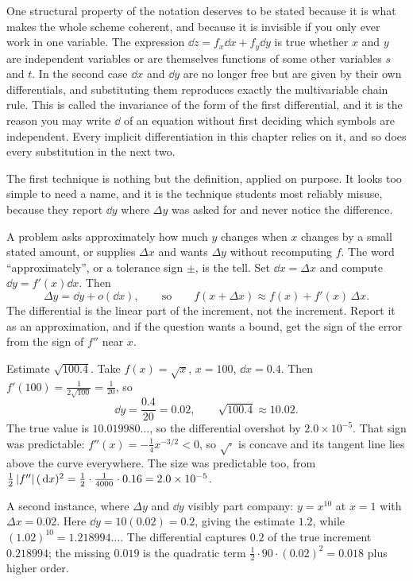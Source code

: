 One structural property of the notation deserves to be stated because it is what makes the whole scheme coherent, and because it is invisible if you only ever work in one variable. The expression $\dd z=f_x\dd x+f_y\dd y$ is true whether $x$ and $y$ are independent variables or are themselves functions of some other variables $s$ and $t$. In the second case $\dd x$ and $\dd y$ are no longer free but are given by their own differentials, and substituting them reproduces exactly the multivariable chain rule. This is called the invariance of the form of the first differential, and it is the reason you may write $\dd$ of an equation without first deciding which symbols are independent. Every implicit differentiation in this chapter relies on it, and so does every substitution in the next two.

The first technique is nothing but the definition, applied on purpose. It looks too simple to need a name, and it is the technique students most reliably misuse, because they report $\dd y$ where $\Delta y$ was asked for and never notice the difference.

\cue A problem asks approximately how much $y$ changes when $x$ changes by a small stated amount, or supplies $\Delta x$ and wants $\Delta y$ without recomputing $f$. The word ``approximately'', or a tolerance sign $\pm$, is the tell.
\method Set $\dd x=\Delta x$ and compute $\dd y=f'(x)\dd x$. Then
\[\Delta y=\dd y+o(\dd x),\qquad\text{so}\qquad f(x+\Delta x)\approx f(x)+f'(x)\,\Delta x.\]
The differential is the linear part of the increment, not the increment. Report it as an approximation, and if the question wants a bound, get the sign of the error from the sign of $f''$ near $x$.

\begin{worked}
Estimate $\sqrt{100.4}$. Take $f(x)=\sqrt x$, $x=100$, $\dd x=0.4$. Then $f'(100)=\tfrac{1}{2\sqrt{100}}=\tfrac1{20}$, so
\[\dd y=\frac{0.4}{20}=0.02,\qquad \sqrt{100.4}\approx10.02.\]
The true value is $10.019980\ldots$, so the differential overshot by $2.0\times10^{-5}$. That sign was predictable: $f''(x)=-\tfrac14x^{-3/2}<0$, so $\sqrt{\cdot}$ is concave and its tangent line lies above the curve everywhere. The size was predictable too, from $\tfrac12\left\lvert f''\right\rvert(\,\mathrm{d} x)^{2}=\tfrac12\cdot\tfrac{1}{4000}\cdot0.16=2.0\times10^{-5}$.

A second instance, where $\Delta y$ and $\dd y$ visibly part company: $y=x^{10}$ at $x=1$ with $\Delta x=0.02$. Here $\dd y=10(0.02)=0.2$, giving the estimate $1.2$, while $(1.02)^{10}=1.218994\ldots$. The differential captures $0.2$ of the true increment $0.218994$; the missing $0.019$ is the quadratic term $\tfrac12\cdot90\cdot(0.02)^{2}=0.018$ plus higher order.
\end{worked}

